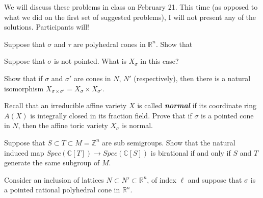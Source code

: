 \documentclass{exam}
\newcommand{\rr}{\mathbb{R}}
\newcommand{\cc}{\mathbb{C}}
\newcommand{\zz}{\mathbb{Z}}
\begin{document}
We will discuss these problems in class on February 21.  This time (as
opposed to what we did on the first set of suggested problems), I will
not present any of the solutions.  Participants will!

\begin{questions}

  \question Suppose that $\sigma$ and $\tau$ are polyhedral cones in $\rr^n$.
  Show that

  \question Suppose that $\sigma$ is not pointed.  What is $X_\sigma$ in this case?

  \question Show that if $\sigma$ and $\sigma'$ are cones in $N$, $N'$ (respectively), then
    there is a natural isomorphism $X_{\sigma \times \sigma'} = X_\sigma \times X_{\sigma'}$.
  
  \question Recall that an irreducible affine variety $X$ is called {\bf\it normal} if its
  coordinate ring $A(X)$ is integrally closed in its fraction field.  Prove that if $\sigma$
  is a pointed cone in $N$, then the affine toric variety $X_\sigma$ is normal.

  \question Suppose that $S \subset T \subset M = \zz^n$ are sub semigroups.
  Show that the natural induced map $Spec(\cc[T]) \longrightarrow Spec(\cc[S])$
  is birational if and only if $S$ and $T$ generate the same subgroup of $M$.

  \question Consider an inclusion of lattices $N \subset N' \subset \rr^n$, of index $\ell$
  and suppose that $\sigma$ is a pointed rational polyhedral cone in $\rr^n$.
  

\end{questions}
\end{document}
